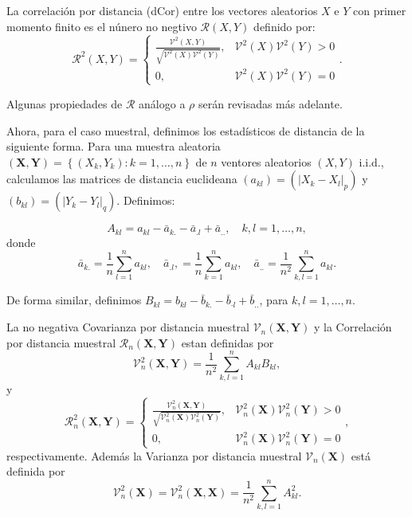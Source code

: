 	\begin{defn} 
		La correlaci\'on por distancia (dCor) entre los vectores aleatorios $X$ e $Y$ con primer momento finito es el n\'unero no negtivo $\mathcal{R}(X, Y)$ definido por:
		$$
		\mathcal{R}^2(X, Y)= \begin{cases}\frac{\mathcal{V}^2(X, Y)}{\sqrt{\mathcal{V}^2(X) \mathcal{V}^2(Y)}}, & \mathcal{V}^2(X) \mathcal{V}^2(Y)>0 \\ 0, & \mathcal{V}^2(X) \mathcal{V}^2(Y)=0\end{cases}.
		$$

	Algunas propiedades de $\mathcal{R}$ an\'alogo a $\rho$ ser\'an revisadas m\'as adelante. 
	\end{defn}

	Ahora, para el caso muestral, definimos los estad\'isticos de distancia de la siguiente forma. Para una muestra aleatoria $(\mathbf{X}, \mathbf{Y})=\left\{\left(X_k, Y_k\right): k=1, \ldots, n\right\}$ de $n$ ventores aleatorios $(X, Y)$ i.i.d., calculamos las matrices de distancia euclideana  $\left(a_{k l}\right)=\left(\left|X_k-X_l\right|_p\right)$ y $\left(b_{k l}\right)=\left(\left|Y_k-Y_l\right|_q\right)$. Definimos:

	$$
	A_{k l}=a_{k l}-\bar{a}_{k .}-\bar{a}_{. l}+\bar{a}_{. .}, \quad k, l=1, \ldots, n,
	$$
	donde
	$$
	\bar{a}_{k .}=\frac{1}{n} \sum_{l=1}^n a_{k l}, \quad \bar{a}_{. l},=\frac{1}{n} \sum_{k=1}^n a_{k l}, \quad \bar{a}_{. .}=\frac{1}{n^2} \sum_{k, l=1}^n a_{k l} .
	$$
	
	De forma similar, definimos $B_{k l}=b_{k l}-\bar{b}_{k .}-\bar{b}_{\cdot l}+\bar{b}_{. .}$, para $k, l=1, \ldots, n$.

	\begin{defn}
		La no negativa Covarianza por distancia muestral $\mathcal{V}_n(\mathbf{X}, \mathbf{Y})$ y la Correlaci\'on por distancia muestral $\mathcal{R}_n(\mathbf{X}, \mathbf{Y})$ estan definidas por
		$$
		\mathcal{V}_n^2(\mathbf{X}, \mathbf{Y})=\frac{1}{n^2} \sum_{k, l=1}^n A_{k l} B_{k l},
		$$
		y
		$$
		\mathcal{R}_n^2(\mathbf{X}, \mathbf{Y})= \begin{cases}\frac{\mathcal{V}_n^2(\mathbf{X}, \mathbf{Y})}{\sqrt{\mathcal{V}_n^2(\mathbf{X}) \mathcal{V}_n^2(\mathbf{Y})}}, & \mathcal{V}_n^2(\mathbf{X}) \mathcal{V}_n^2(\mathbf{Y})>0 \\ 0, & \mathcal{V}_n^2(\mathbf{X}) \mathcal{V}_n^2(\mathbf{Y})=0\end{cases},
		$$
		respectivamente. Adem\'as la Varianza por distancia muestral $\mathcal{V}_n(\mathbf{X})$ est\'a definida por
		$$
		\mathcal{V}_n^2(\mathbf{X})=\mathcal{V}_n^2(\mathbf{X}, \mathbf{X})=\frac{1}{n^2} \sum_{k, l=1}^n A_{k l}^2 .
		$$
	\end{defn}

